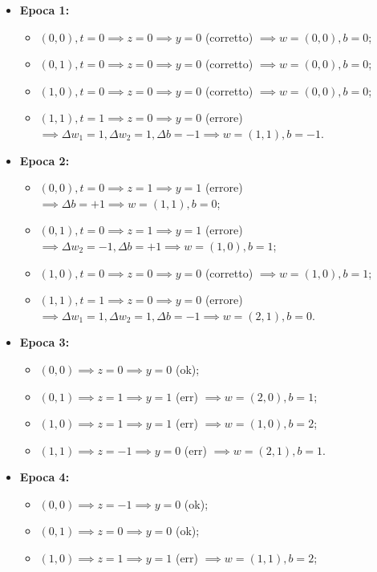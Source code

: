 \begin{itemize}
    \item \textbf{Epoca 1:}
    \begin{itemize}
        \item $(0,0), t=0 \implies z=0 \implies y=0$ (corretto) $\implies w=(0,0), b=0$;
        \item $(0,1), t=0 \implies z=0 \implies y=0$ (corretto) $\implies w=(0,0), b=0$;
        \item $(1,0), t=0 \implies z=0 \implies y=0$ (corretto) $\implies w=(0,0), b=0$;
        \item $(1,1), t=1 \implies z=0 \implies y=0$ (errore) $\implies \Delta w_1=1, \Delta w_2=1, \Delta b=-1 \implies w=(1,1), b=-1$.
    \end{itemize}
    \item \textbf{Epoca 2:}
    \begin{itemize}
        \item $(0,0), t=0 \implies z=1 \implies y=1$ (errore) $\implies \Delta b=+1 \implies w=(1,1), b=0$;
        \item $(0,1), t=0 \implies z=1 \implies y=1$ (errore) $\implies \Delta w_2=-1, \Delta b=+1 \implies w=(1,0), b=1$;
        \item $(1,0), t=0 \implies z=0 \implies y=0$ (corretto) $\implies w=(1,0), b=1$;
        \item $(1,1), t=1 \implies z=0 \implies y=0$ (errore) $\implies \Delta w_1=1, \Delta w_2=1, \Delta b=-1 \implies w=(2,1), b=0$.
    \end{itemize}
    \item \textbf{Epoca 3:}
    \begin{itemize}
        \item $(0,0) \implies z=0 \implies y=0$ (ok);
        \item $(0,1) \implies z=1 \implies y=1$ (err) $\implies w=(2,0), b=1$;
        \item $(1,0) \implies z=1 \implies y=1$ (err) $\implies w=(1,0), b=2$;
        \item $(1,1) \implies z=-1 \implies y=0$ (err) $\implies w=(2,1), b=1$.
    \end{itemize}
    \item \textbf{Epoca 4:}
    \begin{itemize}
        \item $(0,0) \implies z=-1 \implies y=0$ (ok);
        \item $(0,1) \implies z=0 \implies y=0$ (ok);
        \item $(1,0) \implies z=1 \implies y=1$ (err) $\implies w=(1,1), b=2$;

\end{itemize}
\end{itemize}
